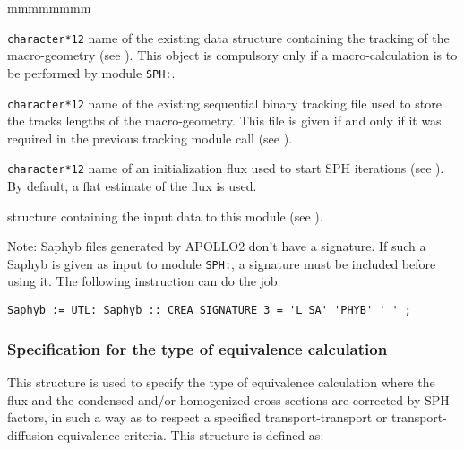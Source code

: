 \begin{ListeDeDescription}{mmmmmmmm}
\item[\dusa{TRKNAM}] {\tt character*12} name of the existing  data
structure containing the tracking of the macro-geometry (see ). This object
is compulsory only if a macro-calculation is to be performed by module {\tt SPH:}.

\item[\dusa{TRKFIL}] {\tt character*12} name of the existing sequential binary tracking
file used to store the tracks lengths of the macro-geometry. This file is given if and only if it was
required in the previous tracking module call (see ).

\item[\dusa{FLUNAM}] {\tt character*12} name of an initialization flux used to start SPH iterations (see ). By
default, a flat estimate of the flux is used.

\item[\dstr{descsph}] structure containing the input data to this module
(see ).

\end{ListeDeDescription}

Note: Saphyb files generated by APOLLO2 don't have a signature. If such a Saphyb is given as input
to module {\tt SPH:}, a signature must be included before using it. The following instruction
can do the job:
\begin{verbatim}
Saphyb := UTL: Saphyb :: CREA SIGNATURE 3 = 'L_SA' 'PHYB' ' ' ;
\end{verbatim}

\subsubsection{Specification for the type of equivalence calculation}\label{sect:descsph}

This structure is used to specify the type of equivalence calculation where the
flux and the condensed and/or homogenized cross sections are corrected by SPH
factors, in such a way as to respect a specified transport-transport or
transport-diffusion equivalence criteria.\cite{ALSB1,ALSB2,ALSB3} This
structure is defined as:

